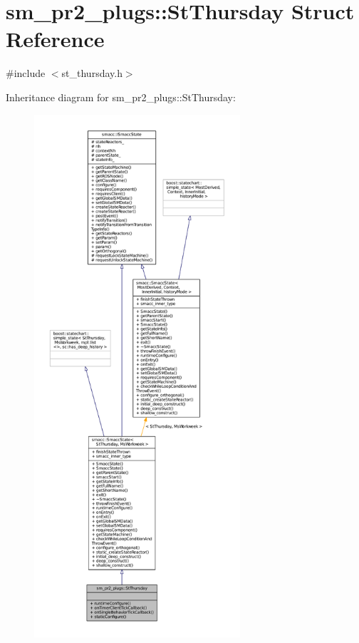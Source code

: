 \hypertarget{structsm__pr2__plugs_1_1StThursday}{}\section{sm\+\_\+pr2\+\_\+plugs\+:\+:St\+Thursday Struct Reference}
\label{structsm__pr2__plugs_1_1StThursday}


{\ttfamily \#include $<$st\+\_\+thursday.\+h$>$}



Inheritance diagram for sm\+\_\+pr2\+\_\+plugs\+:\+:St\+Thursday\+:
\nopagebreak
\begin{figure}[H]
\begin{center}
\leavevmode
\includegraphics[height=550pt]{structsm__pr2__plugs_1_1StThursday__inherit__graph}
\end{center}
\end{figure}


